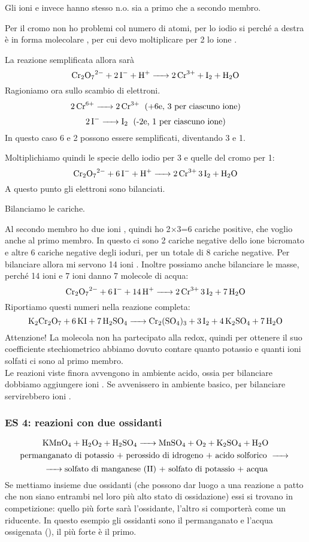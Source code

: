 Gli ioni  e  invece hanno stesso n.o. sia a primo che a secondo membro.

Per il cromo non ho problemi col numero di atomi, per lo iodio si perché a destra è in forma molecolare , per cui devo moltiplicare per 2 lo ione .

La reazione semplificata allora sarà
$$\ce{Cr_2O_7^2- + 2I^- + H+ -> 2Cr^3+ + I_2 + H_2O}$$
Ragioniamo ora sullo scambio di elettroni.
$$\ce{2Cr^6+ -> 2Cr^3+ \; \text{(+6e, 3 per ciascuno ione)}}$$
$$\ce{2I- -> I_2 \; \text{(-2e, 1 per ciascuno ione)}}$$
In questo caso 6 e 2 possono essere semplificati, diventando 3 e 1.

Moltiplichiamo quindi le specie dello iodio per 3 e quelle del cromo per 1:
$$\ce{Cr_2O_7^2- + 6I^- + H+ -> 2Cr^3+ 3I_2 + H_2O}$$
A questo punto gli elettroni sono bilanciati.

Bilanciamo le cariche.

Al secondo membro ho due ioni , quindi ho 2$\times$3=6 cariche positive, che voglio anche al primo membro. In questo ci sono 2 cariche negative dello ione bicromato e altre 6 cariche negative degli ioduri, per un totale di 8 cariche negative. Per bilanciare allora mi servono 14 ioni . Inoltre possiamo anche bilanciare le masse, perché 14 ioni  e 7 ioni  danno 7 molecole di acqua:
$$\ce{Cr_2O_7^2- + 6I^- + 14H+ -> 2Cr^3+ 3I_2 + 7H_2O}$$
Riportiamo questi numeri nella reazione completa:
$$\ce{K_2Cr_2O_7 + 6KI + 7H_2SO_4 -> Cr_2(SO_4)_3 + 3I_2 + 4K_2SO_4 + 7H_2O}$$
Attenzione! La molecola  non ha partecipato alla redox, quindi per ottenere il suo coefficiente stechiometrico abbiamo dovuto contare quanto potassio e quanti ioni solfati ci sono al primo membro.\\

Le reazioni viste finora avvengono in ambiente acido, ossia per bilanciare dobbiamo aggiungere ioni . Se avvenissero in ambiente basico, per bilanciare servirebbero ioni .\\
\subsubsection{\textbf{ES 4: reazioni con due ossidanti}}
$$\ce{KMnO_4 + H_2O_2 + H_2SO_4 -> MnSO_4 + O_2 + K_2SO_4 + H_2O}$$
$$\text{permanganato di potassio + perossido di idrogeno + acido solforico }\ce{->}$$
$$\ce{->}\text{solfato di manganese (II) + solfato di potassio + acqua}$$
Se mettiamo insieme due ossidanti (che possono dar luogo a una reazione a patto che non siano entrambi nel loro più alto stato di ossidazione) essi si trovano in competizione: quello più forte sarà l'ossidante, l'altro si comporterà come un riducente. In questo esempio gli ossidanti sono il permanganato e l'acqua ossigenata (), il più forte è il primo.

